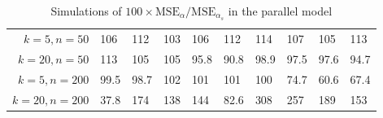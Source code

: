 
\begin{table}[ht]
\centering
\caption{Simulations of $100 \times \textrm{MSE}_\alpha/\textrm{MSE}_{\alpha_s}$ in the parallel model} 
\begin{tabular}{rlllllllll}
$k = 5, n = 50$ & 106 & 112 & 103 & 106 & 112 & 114 & 107 & 105 & 113 \\ 
  $k = 20, n = 50$ & 113 & 105 & 105 & 95.8 & 90.8 & 98.9 & 97.5 & 97.6 & 94.7 \\ 
  $k = 5, n = 200$ & 99.5 & 98.7 & 102 & 101 & 101 & 100 & 74.7 & 60.6 & 67.4 \\ 
  $k = 20, n = 200$ & 37.8 & 174 & 138 & 144 & 82.6 & 308 & 257 & 189 & 153 \\ 
  \end{tabular}
\end{table}
\newcommand{\geomean}{1.08}
